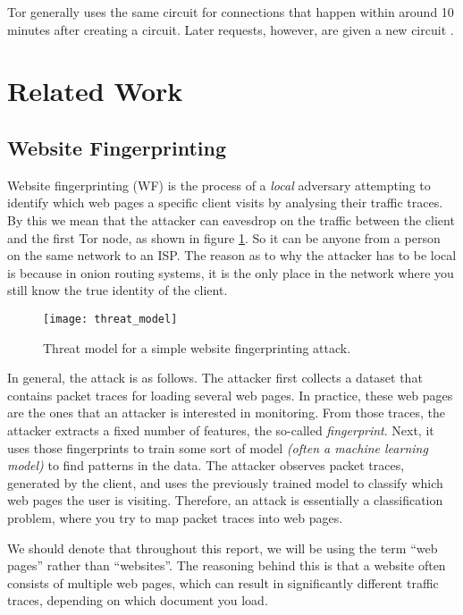 Tor generally uses the same circuit for connections that happen within around 10 minutes after creating a circuit.
Later requests, however, are given a new circuit \cite{tor_project, tor_project2}.

\section{Related Work}

\subsection{Website Fingerprinting} \label{sec:related-work}

Website fingerprinting (WF) is the process of a \textit{local} adversary attempting to identify which web pages a specific client visits by analysing their traffic traces.
By this we mean that the attacker can eavesdrop on the traffic between the client and the first Tor node, as shown in figure \ref{fig:threat_model}.
So it can be anyone from a person on the same network to an ISP.
The reason as to why the attacker has to be local is because in onion routing systems, it is the only place in the network where you still know
the true identity of the client.

\begin{figure}[ht]
  \centering
  \texttt{[image: threat\_model]}
  \caption{Threat model for a simple website fingerprinting attack.}
  \label{fig:threat_model}
\end{figure}

In general, the attack is as follows. The attacker first collects a dataset that contains packet traces for loading several web pages.
In practice, these web pages are the ones that an attacker is interested in monitoring.
From those traces, the attacker extracts a fixed number of features, the so-called \textit{fingerprint}.
Next, it uses those fingerprints to train some sort of model \textit{(often a machine learning model)} to find patterns in the data.
The attacker observes packet traces, generated by the client, and uses the previously trained model to classify which web pages the user is visiting.
Therefore, an attack is essentially a classification problem, where you try to map packet traces into web pages.

We should denote that throughout this report, we will be using the term ``web pages'' rather than ``websites''.
The reasoning behind this is that a website often consists of multiple web pages,
which can result in significantly different traffic traces, depending on which document you load.

